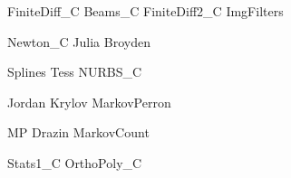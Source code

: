 \documentclass{newsiambook}
\begin{document}
{FiniteDiff_C}
{Beams_C}
{FiniteDiff2_C}
{ImgFilters}


{Newton_C}
{Julia}
{Broyden}


% 



{Splines}
{Tess}
{NURBS_C}

{Jordan}
{Krylov}
{MarkovPerron}

{MP}
{Drazin}
{MarkovCount}











{Stats1_C}
{OrthoPoly_C}
\end{document}
